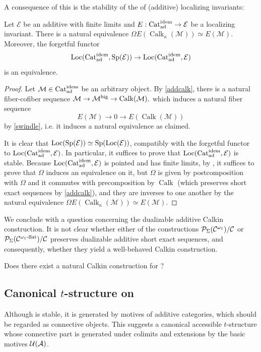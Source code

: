 \documentclass[a4paper,10pt, oneside]{amsart}
\begin{document}
A consequence of this is the stability of the \infcat of (additive) localizing invariants:
\begin{cor}
 Let $\mathcal{E}$ be an additive \infcat with finite limits and $E:\mathrm{Cat}_{\mathrm{ad}}^{\mathrm{idem}}\to\mathcal{E}$ be a localizing invariant. There is a natural equivalence $\Omega E\left(\operatorname{Calk}_\kappa(\mathcal{M})\right) \simeq E(\mathcal{M})$. Moreover, the forgetful functor $$\operatorname{Loc}(\mathrm{Cat}_{\mathrm{ad}}^{\mathrm{idem}},\operatorname{Sp}(\mathcal{E})) \rightarrow \operatorname{Loc}(\mathrm{Cat}_{\mathrm{ad}}^{\mathrm{idem}},\mathcal{E})$$ is an equivalence.
\end{cor}
\begin{proof}
	Let $\mathcal{M}\in\mathrm{Cat}_{\mathrm{ad}}^{\mathrm{idem}}$ be an arbitrary object. By \cref{addcalk}, there is a natural fiber-cofiber sequence $\mathcal{M} \rightarrow \mathcal{M}^{\mathrm{big}} \rightarrow \operatorname{Calk}(\mathcal{M}),$ which induces a natural fiber sequence $$E(\mathcal{M}) \rightarrow 0 \rightarrow E\left(\operatorname{Calk}(\mathcal{M})\right)$$ by \cref{swindle}, i.e. it induces a natural equivalence as claimed.
	
It is clear that $\operatorname{Loc}(\mathrm{Sp}(\mathcal{E})) \simeq \mathrm{Sp}(\operatorname{Loc}(\mathcal{E}))$, compatibly with the forgetful functor to $\operatorname{Loc}(\mathrm{Cat}_{\mathrm{ad}}^{\mathrm{idem}},\mathcal{E})$. In particular, it suffices to prove that $\operatorname{Loc}(\mathrm{Cat}_{\mathrm{ad}}^{\mathrm{idem}},\mathcal{E})$ is stable.
	Because $\operatorname{Loc}(\mathrm{Cat}_{\mathrm{ad}}^{\mathrm{idem}},\mathcal{E})$ is pointed and has finite limits, by 
	\cite[Proposition 1.4.2.11.(3)]{ha}, it suffices to prove that $\Omega$ induces an equivalence on it, but $\Omega$ is given by postcomposition with $\Omega$ and it commutes with precomposition by $\operatorname{Calk}$ (which preserves short exact sequences by \cref{addcalk}), and they are inverses to one another by the natural equivalence $\Omega E\left(\operatorname{Calk}_\kappa(\mathcal{M})\right) \simeq E(\mathcal{M})$.
\end{proof}
We conclude with a question concerning the dualizable additive Calkin construction. It is not clear whether either of the constructions $\mathcal{P}_{\Sigma}(\mathcal{C}^{\omega_1})/\mathcal{C}$ or $\mathcal{P}_{\Sigma}(\mathcal{C}^{\omega_1\text{-}\mathrm{flat}})/\mathcal{C}$ preserves dualizable additive short exact sequences, and consequently, whether they yield a well-behaved Calkin construction.

\begin{quest}
	Does there exist a natural Calkin construction for \dualaddinfcats?
\end{quest}
\subsection{Canonical $t$-structure on \motpst}
Although \motpst is stable, it is generated by motives of additive categories,
which should be regarded as connective objects.  This suggests a canonical
accessible \(t\)-structure whose connective part is generated under colimits
and extensions by the basic motives \(\mathcal{U}(\mathcal{A})\).
\end{document}
